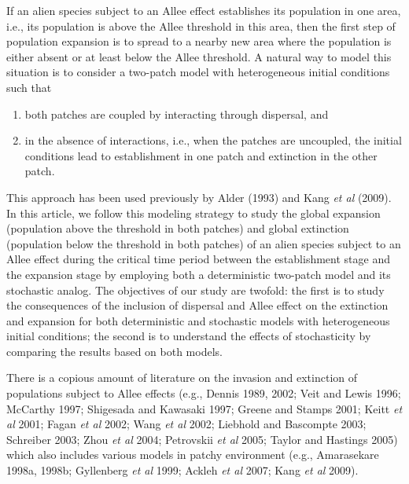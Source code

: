\indent If an alien species subject to an Allee effect establishes its population in one area, i.e., its population is above the Allee
 threshold in this area, then the first step of population expansion is to spread to a nearby new area where the population is either
 absent or at least below the Allee threshold.
 A natural way to model this situation is to consider a two-patch model with heterogeneous initial conditions such that
\begin{enumerate}
 \item both patches are coupled by interacting through dispersal, and \vspace{4pt}
 \item in the absence of interactions, i.e., when the patches are uncoupled, the initial conditions lead to establishment
  in one patch and extinction in the other patch.
\end{enumerate}
 This approach has been used previously by Alder (1993) and Kang \emph{et al} (2009).
 In this article, we follow this modeling strategy to study the global expansion (population above the threshold in both patches) and
 global extinction (population below the threshold in both patches) of an alien species subject to an Allee effect during the critical
 time period between the establishment stage and the expansion stage by employing both a deterministic two-patch model and its
 stochastic analog.
 The objectives of our study are twofold:
 the first is to study the consequences of the inclusion of dispersal and Allee effect on the extinction and expansion
 for both deterministic and stochastic models with heterogeneous initial conditions;
 the second is to understand the effects of stochasticity by comparing the results based on both models.

\indent There is a copious amount of literature on the invasion and extinction of populations subject to Allee effects (e.g.,
 Dennis 1989, 2002; Veit and Lewis 1996;  McCarthy 1997; Shigesada and Kawasaki 1997; Greene and Stamps 2001;
 Keitt \emph{et al} 2001; Fagan \emph{et al} 2002; Wang \emph{et al} 2002; Liebhold and Bascompte 2003; Schreiber 2003;
 Zhou \emph{et al} 2004; Petrovskii \emph{et al} 2005; Taylor and Hastings 2005) which also includes various models in patchy
 environment (e.g., Amarasekare 1998a, 1998b; Gyllenberg \emph{et al} 1999; Ackleh \emph{et al} 2007; Kang \emph{et al} 2009).

